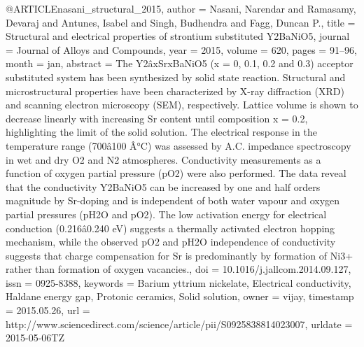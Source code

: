 @ARTICLE{nasani_structural_2015,
  author = {Nasani, Narendar and Ramasamy, Devaraj and Antunes, Isabel and Singh,
	Budhendra and Fagg, Duncan P.},
  title = {Structural and electrical properties of strontium substituted {Y}2BaNiO5},
  journal = {Journal of Alloys and Compounds},
  year = {2015},
  volume = {620},
  pages = {91--96},
  month = jan,
  abstract = {The Y2âxSrxBaNiO5 (x = 0, 0.1, 0.2 and 0.3) acceptor substituted
	system has been synthesized by solid state reaction. Structural and
	microstructural properties have been characterized by X-ray diffraction
	(XRD) and scanning electron microscopy (SEM), respectively. Lattice
	volume is shown to decrease linearly with increasing Sr content until
	composition x = 0.2, highlighting the limit of the solid solution.
	The electrical response in the temperature range (700â100 Â°C)
	was assessed by A.C. impedance spectroscopy in wet and dry O2 and
	N2 atmospheres. Conductivity measurements as a function of oxygen
	partial pressure (pO2) were also performed. The data reveal that
	the conductivity Y2BaNiO5 can be increased by one and half orders
	magnitude by Sr-doping and is independent of both water vapour and
	oxygen partial pressures (pH2O and pO2). The low activation energy
	for electrical conduction (0.216â0.240 eV) suggests a thermally
	activated electron hopping mechanism, while the observed pO2 and
	pH2O independence of conductivity suggests that charge compensation
	for Sr is predominantly by formation of Ni3+ rather than formation
	of oxygen vacancies.},
  doi = {10.1016/j.jallcom.2014.09.127},
  issn = {0925-8388},
  keywords = {Barium yttrium nickelate, Electrical conductivity, Haldane energy
	gap, Protonic ceramics, Solid solution},
  owner = {vijay},
  timestamp = {2015.05.26},
  url = {http://www.sciencedirect.com/science/article/pii/S0925838814023007},
  urldate = {2015-05-06TZ}
}


